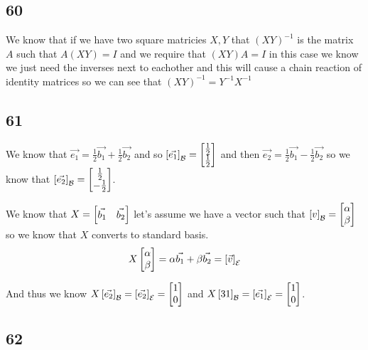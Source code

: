 \documentclass[11pt]{book}
\begin{document}

\subsection{60}%
\label{sub:60}

We know that if we have two square matricies $X,Y$ that $\left( XY \right) ^{-1} $ is the matrix $A$ such that $A\left( XY \right) = I$ and we require that $\left( XY \right) A= I$ in this case we know we just need the inverses next to eachother and this will cause a chain reaction of identity matrices so we can see that $\left( XY \right) ^{-1} = Y^{-1} X^{-1} $ 


\subsection{61}%
\label{sub:61}

We know that $ \vec{e_1} = \frac{1}{2}\vec{b_1} + \frac{1}{2}\vec{b_2} $ and so $\left[ \vec{e_1}  \right]_{\mathcal{B}} = \begin{bmatrix} \frac{1}{2} \\ \frac{1}{2} \end{bmatrix} $ and then $\vec{e_2} = \frac{1}{2}\vec{b_1}  - \frac{1}{2}\vec{b_2} $ so we know that $\left[ \vec{e_2}  \right]_{\mathcal{B}} = \begin{bmatrix} \frac{1}{2} \\ -\frac{1}{2} \end{bmatrix} $. 

We know that $X= \begin{bmatrix} \vec{b_1}  & \vec{b_2}  \end{bmatrix}$ let's assume we have a vector such that $\left[ v \right]_{\mathcal{B}} = \begin{bmatrix} \alpha  \\ \beta  \end{bmatrix} $  so we know that $X$ converts to standard basis.
\begin{equation*}
    X\begin{bmatrix} \alpha  \\ \beta  \end{bmatrix} = \alpha \vec{b_1}  + \beta \vec{b_2} = \left[ \vec{v}  \right]_{\mathcal{E}} 
\end{equation*}

And thus we know $X\left[ \vec{e_2}  \right]_{\mathcal{B}} = \left[ \vec{e_2}  \right]_{\mathcal{E}} = \begin{bmatrix} 1 \\ 0 \end{bmatrix} $ and $X\left[ 31 \right]_{\mathcal{B}} = \left[ \vec{e_1}  \right]_{\mathcal{E}} = \begin{bmatrix} 1 \\ 0 \end{bmatrix} $. 


\subsection{62}%
\label{sub:62}
\end{document}
